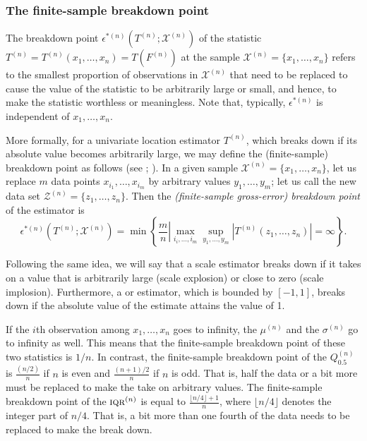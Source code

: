 \subsubsection{The finite-sample breakdown point}

The breakdown point $\epsilon^{*(n)}(T^{(n)}; \mathcal{X}^{(n)})$ of the statistic
$T^{(n)} = T^{(n)}(x_1, \dots, x_n) = T(F^{(n)})$ at the sample $\mathcal{X}^{(n)}
= \{x_1, \dots, x_n\}$ refers to the smallest proportion of observations
in $\mathcal{X}^{(n)}$ that need to be replaced to cause the value of the
statistic to be arbitrarily large or small, and hence, to make the statistic
worthless or meaningless. Note that, typically, $\epsilon^{*(n)}$ is
independent of $x_1, \dots, x_n$.

More formally, for a univariate location estimator $T^{(n)}$, which breaks down
if its absolute value becomes arbitrarily large, we may define the (finite-sample)
breakdown point as follows (see \citealp{hampel:stahel:1982};
\citealp{donoho:huber:1983}). In a given sample $\mathcal{X}^{(n)} = \{x_1,
\dots, x_n\}$, let us replace $m$ data points $x_{i_1}, \dots, x_{i_{m}}$
by arbitrary values $y_1, \dots, y_{m}$; let us call the new data set       
$\mathcal{Z}^{(n)} = \{z_1, \dots, z_n\}$. Then the \emph{(finite-sample
gross-error) breakdown point} of the estimator is
\[
    \epsilon^{*(n)}(T^{(n)}; \mathcal{X}^{(n)}) 
    = \min \left\{\left. \frac{m}{n}\right| \max_{i_i, \dots, i_{m}} \sup_{y_1, \dots, y_{m}} 
      \left|T^{(n)}(z_1, \dots, z_n)\right| =\infty \right\}.
\]

Following the same idea, we will say that a scale estimator breaks down if it
takes on a value that is arbitrarily large (scale explosion) or close to zero
(scale implosion). Furthermore, a  or 
estimator, which is bounded by $[-1, 1]$, breaks down if the absolute value of
the estimate attains the value of 1.

\begin{stexample}
If the $i$th observation among $x_1, \dots, x_n$ goes to infinity, the 
$\mu^{(n)}$ and the  $\sigma^{(n)}$ go to infinity as well. This
means that the finite-sample breakdown point of these two statistics is $1/n$.
In contrast, the finite-sample breakdown point of the  $Q_{0.5}^{(n)}$ is
$\frac{(n/2)}{n}$ if $n$ is even and $\frac{(n+1)/2}{n}$ if $n$ is odd. That is,
half the data or a bit more must be replaced to make the  take on arbitrary
values. The finite-sample breakdown point of the 
$\stsc{IQR}^{(n)}$ is equal to $\frac{\lfloor n/4 \rfloor + 1}{n}$, where
$\lfloor n/4 \rfloor $ denotes the integer part of $n/4$. That is, a bit more than 
one fourth of the data needs to be replaced to make the  break down.
\end{stexample}

